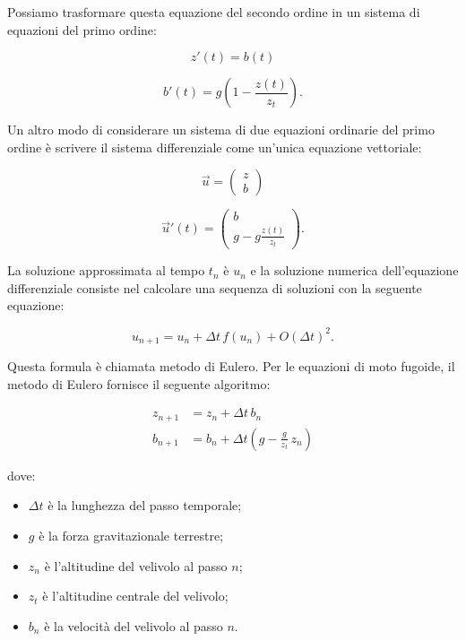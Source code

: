 \noindent
Possiamo trasformare questa equazione del secondo ordine in un sistema di equazioni del primo ordine:

\begin{equation}
z'(t) = b(t)
\end{equation}

\begin{equation}
b'(t) = g\left(1-\frac{z(t)}{z_t}\right).
\end{equation}

\noindent
Un altro modo di considerare un sistema di due equazioni ordinarie del primo ordine è scrivere il sistema differenziale come un’unica equazione vettoriale:

\begin{equation}
\vec{u}  = \begin{pmatrix} z \\ b \end{pmatrix}
\end{equation}

\begin{equation}
\vec{u}'(t)  = \begin{pmatrix} b\\ g-g\frac{z(t)}{z_t} \end{pmatrix}.
\end{equation}

\noindent
La soluzione approssimata al tempo $t_n$ è $u_n$ e la soluzione numerica dell’equazione differenziale consiste nel calcolare una sequenza di soluzioni con la seguente equazione:

\begin{equation}
u_{n+1} = u_n + \Delta t \,f(u_n) + O(\Delta t)^2.
\end{equation}

\noindent
Questa formula è chiamata metodo di Eulero. Per le equazioni di moto fugoide, il metodo di Eulero fornisce il seguente algoritmo:

\begin{align}
z_{n+1} & = z_n + \Delta t \, b_n \\
b_{n+1} & = b_n + \Delta t \left(g - \frac{g}{z_t} \, z_n \right)
\end{align}

\noindent
dove:
\begin{itemize}
\item $\Delta t$ è la lunghezza del passo temporale;
\item $g$ è la forza gravitazionale terrestre;
\item $z_n$ è l'altitudine del velivolo al passo $n$;
\item $z_t$ è l'altitudine centrale del velivolo;
\item $b_n$ è la velocità del velivolo al passo $n$.
\end{itemize}

